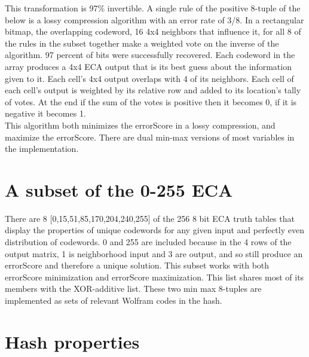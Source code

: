 \documentclass[11pt]{article}
\begin{document}
This transformation is 97\% invertible. A single rule of the positive 8-tuple of the below is a lossy compression algorithm with an error rate of 3/8. In a rectangular bitmap, the overlapping codeword, 16 4x4 neighbors that influence it, for all 8 of the rules in the subset together make a weighted vote on the inverse of the algorithm. 97 percent of bits were successfully recovered. Each codeword in the array produces a 4x4 ECA output that is its best guess about the information given to it. Each cell's 4x4 output overlaps with 4 of its neighbors. Each cell of each cell's output is weighted by its relative row and added to its location's tally of votes. At the end if the sum of the votes is positive then it becomes 0, if it is negative it becomes 1.\\

This algorithm both minimizes the errorScore in a lossy compression, and maximize the errorScore. There are dual min-max versions of most variables in the implementation.\\

\section{A subset of the 0-255 ECA}

There are 8 [0,15,51,85,170,204,240,255] of the 256 8 bit ECA truth tables that display the properties of unique codewords for any given input and perfectly even distribution of codewords. 0 and 255 are included because in the 4 rows of the output matrix, 1 is neighborhood input and 3 are output, and so still produce an errorScore and therefore a unique solution. This subset works with both errorScore minimization and errorScore maximization. This list shares most of its members with the XOR-additive list. \cite{xorAdditive} These two min max 8-tuples are implemented as sets of relevant Wolfram codes in the hash.\\

\section{Hash properties}
\end{document}
